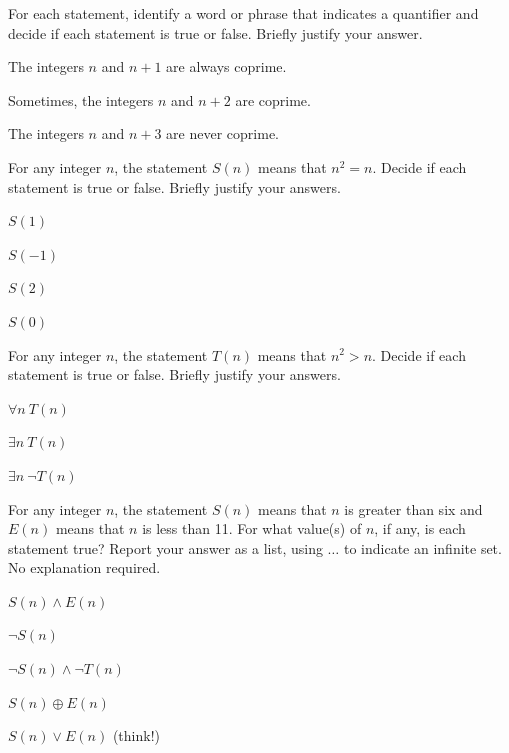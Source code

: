 \begin{exer}[\exerP] %
\label{exer_quant_coprime}
    For each statement, identify a word or phrase that indicates a quantifier and decide if each statement is true or false.  Briefly justify your answer. 
        
        \begin{exerpart}
            \item The integers $n$ and $n+1$ are always coprime.
            \item Sometimes, the integers $n$ and $n+2$ are coprime.
            \item The integers $n$ and $n+3$ are never coprime.
        \end{exerpart}
\end{exer}

\begin{exer}[\exerP] %
\label{exer_equals_own_sq_predicate}
    For any integer $n$, the statement $S(n)$ means that $n^2=n$.  Decide if each statement is true or false. Briefly justify your answers.
        \begin{exerpart}  
            \item $S(1)$ 
            \item $S(-1)$
            \item $S(2)$
            \item $S(0)$
        \end{exerpart}
\end{exer}

\begin{exer}[\exerP] %
\label{exer_equals_own_sq_quants}
    For any integer $n$, the statement $T(n)$ means that $n^2>n$.  Decide if each statement is true or false. Briefly justify your answers.
        \begin{exerpart}  
            \item $\forall n ~ T(n)$
            \item $\exists n ~ T(n)$
            \item $\exists n ~ \neg T(n)$
        \end{exerpart}
\end{exer}

\begin{exer}[\exerU] %
\label{exer_list_integers_true}
    For any integer $n$, the statement $S(n)$ means that $n$ is greater than six and $E(n)$ means that $n$ is less than 11.  For what value(s) of $n$, if any, is each statement true? Report your answer as a list, using $\ldots$ to indicate an infinite set. No explanation required.
        \begin{exerpart}
            \item $S(n) \land E(n)$
            \item $\neg S(n)$
            \item $\neg S(n) \land \neg T(n)$
            \item $S(n) \oplus E(n)$
            \item $S(n) \lor E(n)$ (think!)
        \end{exerpart}
\end{exer}

